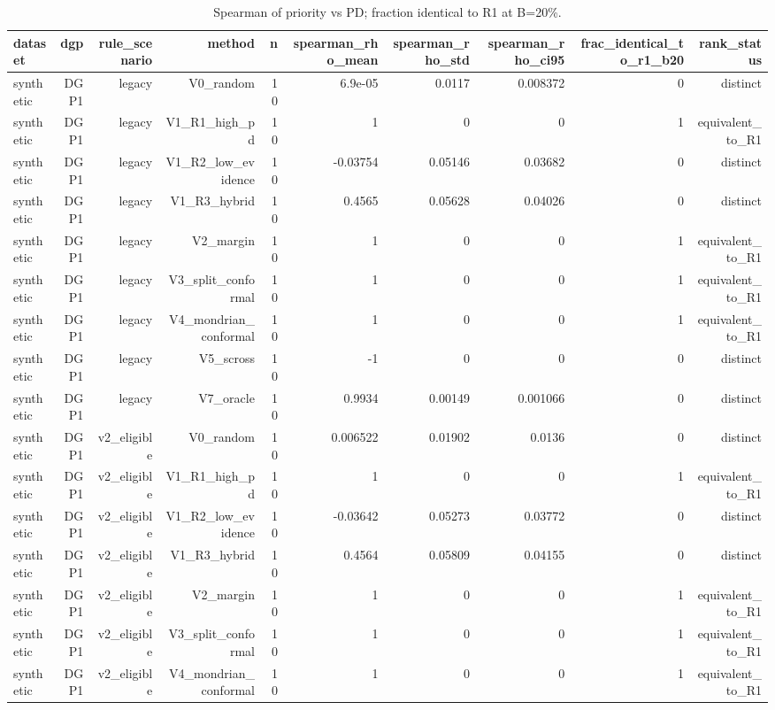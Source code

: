\begin{table}[htbp]
  \centering
  \caption{Spearman of priority vs PD; fraction identical to R1 at B=20\%.}
  \label{tab:T7_rank_equivalence}
  \small
  \begin{tabular}{lrrrrrrrrr}
    \toprule
    dataset & dgp & rule\_scenario & method & n & spearman\_rho\_mean & spearman\_rho\_std & spearman\_rho\_ci95 & frac\_identical\_to\_r1\_b20 & rank\_status \\
    \midrule
    synthetic & DGP1 & legacy & V0\_random & 10 & 6.9e-05 & 0.0117 & 0.008372 & 0 & distinct \\
    synthetic & DGP1 & legacy & V1\_R1\_high\_pd & 10 & 1 & 0 & 0 & 1 & equivalent\_to\_R1 \\
    synthetic & DGP1 & legacy & V1\_R2\_low\_evidence & 10 & -0.03754 & 0.05146 & 0.03682 & 0 & distinct \\
    synthetic & DGP1 & legacy & V1\_R3\_hybrid & 10 & 0.4565 & 0.05628 & 0.04026 & 0 & distinct \\
    synthetic & DGP1 & legacy & V2\_margin & 10 & 1 & 0 & 0 & 1 & equivalent\_to\_R1 \\
    synthetic & DGP1 & legacy & V3\_split\_conformal & 10 & 1 & 0 & 0 & 1 & equivalent\_to\_R1 \\
    synthetic & DGP1 & legacy & V4\_mondrian\_conformal & 10 & 1 & 0 & 0 & 1 & equivalent\_to\_R1 \\
    synthetic & DGP1 & legacy & V5\_scross & 10 & -1 & 0 & 0 & 0 & distinct \\
    synthetic & DGP1 & legacy & V7\_oracle & 10 & 0.9934 & 0.00149 & 0.001066 & 0 & distinct \\
    synthetic & DGP1 & v2\_eligible & V0\_random & 10 & 0.006522 & 0.01902 & 0.0136 & 0 & distinct \\
    synthetic & DGP1 & v2\_eligible & V1\_R1\_high\_pd & 10 & 1 & 0 & 0 & 1 & equivalent\_to\_R1 \\
    synthetic & DGP1 & v2\_eligible & V1\_R2\_low\_evidence & 10 & -0.03642 & 0.05273 & 0.03772 & 0 & distinct \\
    synthetic & DGP1 & v2\_eligible & V1\_R3\_hybrid & 10 & 0.4564 & 0.05809 & 0.04155 & 0 & distinct \\
    synthetic & DGP1 & v2\_eligible & V2\_margin & 10 & 1 & 0 & 0 & 1 & equivalent\_to\_R1 \\
    synthetic & DGP1 & v2\_eligible & V3\_split\_conformal & 10 & 1 & 0 & 0 & 1 & equivalent\_to\_R1 \\
    synthetic & DGP1 & v2\_eligible & V4\_mondrian\_conformal & 10 & 1 & 0 & 0 & 1 & equivalent\_to\_R1 \\

\end{tabular}
\end{table}
